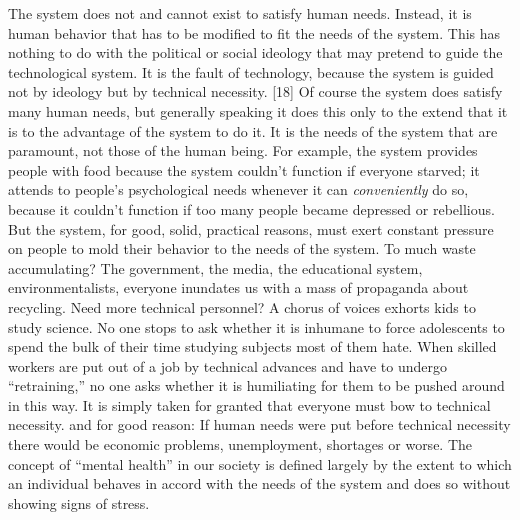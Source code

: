  The system does not and cannot exist to satisfy human needs. Instead, it is human behavior that has to be modified to fit the needs of the system. This has nothing to do with the political or social ideology that may pretend to guide the technological system. It is the fault of technology, because the system is guided not by ideology but by technical necessity. [18] Of course the system does satisfy many human needs, but generally speaking it does this only to the extend that it is to the advantage of the system to do it. It is the needs of the system that are paramount, not those of the human being. For example, the system provides people with food because the system couldn’t function if everyone starved; it attends to people’s psychological needs whenever it can {\em conveniently} do so, because it couldn’t function if too many people became depressed or rebellious. But the system, for good, solid, practical reasons, must exert constant pressure on people to mold their behavior to the needs of the system. To much waste accumulating? The government, the media, the educational system, environmentalists, everyone inundates us with a mass of propaganda about recycling. Need more technical personnel? A chorus of voices exhorts kids to study science. No one stops to ask whether it is inhumane to force adolescents to spend the bulk of their time studying subjects most of them hate. When skilled workers are put out of a job by technical advances and have to undergo “retraining,” no one asks whether it is humiliating for them to be pushed around in this way. It is simply taken for granted that everyone must bow to technical necessity. and for good reason: If human needs were put before technical necessity there would be economic problems, unemployment, shortages or worse. The concept of “mental health” in our society is defined largely by the extent to which an individual behaves in accord with the needs of the system and does so without showing signs of stress.
